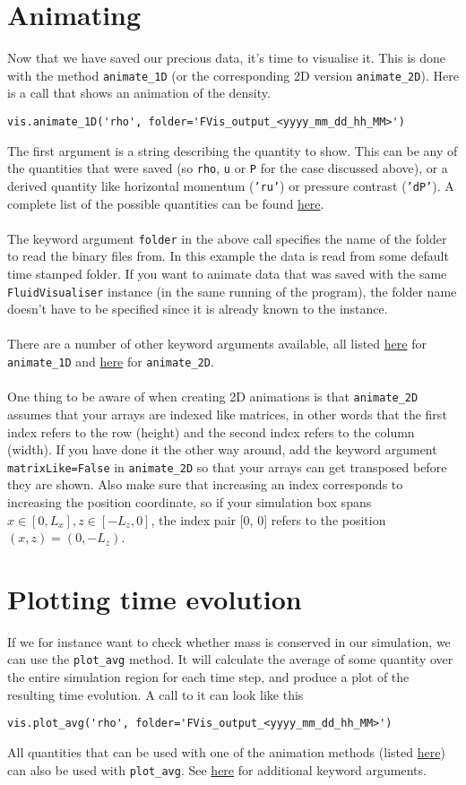 \documentclass{article}
\newcommand{\ttt}[1]{\texttt{#1}}
\begin{document}
\section{Animating}
\label{sec:anim}
Now that we have saved our precious data, it's time to visualise it. This is done with the method \ttt{animate\_1D} (or the corresponding 2D version \ttt{animate\_2D}). Here is a call that shows an animation of the density.
\begin{lstlisting}
vis.animate_1D('rho', folder='FVis_output_<yyyy_mm_dd_hh_MM>')
\end{lstlisting}
The first argument is a string describing the quantity to show. This can be any of the quantities that were saved (so \ttt{rho}, \ttt{u} or \ttt{P} for the case discussed above), or a derived quantity like horizontal momentum (\ttt{'ru'}) or pressure contrast (\ttt{'dP'}). A complete list of the possible quantities can be found \hyperref[sec:quants]{here}.\\\\The keyword argument \ttt{folder} in the above call specifies the name of the folder to read the binary files from. In this example the data is read from some default time stamped folder. If you want to animate data that was saved with the same \ttt{FluidVisualiser} instance (in the same running of the program), the folder name doesn't have to be specified since it is already known to the instance.\\\\There are a number of other keyword arguments available, all listed \hyperref[sec:anim1]{here} for \ttt{animate\_1D} and \hyperref[sec:anim2]{here} for \ttt{animate\_2D}.\\\\One thing to be aware of when creating 2D animations is that \ttt{animate\_2D} assumes that your arrays are indexed like matrices, in other words that the first index refers to the row (height) and the second index refers to the column (width). If you have done it the other way around, add the keyword argument \ttt{matrixLike=False} in \ttt{animate\_2D} so that your arrays can get transposed before they are shown. Also make sure that increasing an index corresponds to increasing the position coordinate, so if your simulation box spans $x\in[0, L_x], z\in[-L_z, 0]$, the index pair [0, 0] refers to the position $(x, z) = (0, -L_z)$.

\section{Plotting time evolution}
\label{sec:plot}
If we for instance want to check whether mass is conserved in our simulation, we can use the \ttt{plot\_avg} method. It will calculate the average of some quantity over the entire simulation region for each time step, and produce a plot of the resulting time evolution. A call to it can look like this
\begin{lstlisting}
vis.plot_avg('rho', folder='FVis_output_<yyyy_mm_dd_hh_MM>')
\end{lstlisting}
All quantities that can be used with one of the animation methods (listed \hyperref[sec:quants]{here}) can also be used with \ttt{plot\_avg}. See \hyperref[sec:pa]{here} for additional keyword arguments.
\end{document}
